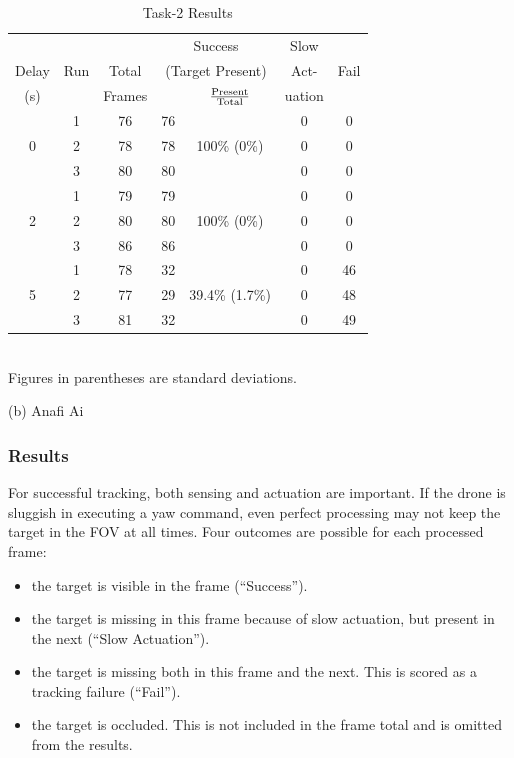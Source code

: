 \begin{table}
\begin{tabular}{|c|c|c|c|c|c|c|}
\hline
		 &  &  & \multicolumn{2}{c|}{Success} & Slow & \\
Delay & Run & Total  & \multicolumn{2}{c|}{\footnotesize (Target Present)} & Act- &  Fail\\
\cline{5-5} 
(s)&  &       Frames  &         & $\rm \frac{Present}{Total}$ & uation  & \\ 
\hline
    & 1 & 76 & 76 &    & 0 & 0 \\
0 & 2 & 78 & 78 & 100\% \scriptsize{(0\%)} & 0 & 0 \\
    & 3 & 80 & 80 &    & 0 & 0 \\
\hline
    & 1 & 79 & 79 &        & 0 & 0 \\
2 & 2 & 80 & 80 & 100\% \scriptsize{(0\%)} & 0 &  0 \\
    & 3 & 86 & 86 &        & 0 &  0 \\
\hline
    & 1 & 78 & 32 &        & 0 &  46 \\
5 & 2 & 77 & 29 & 39.4\% \scriptsize{(1.7\%)} & 0 & 48 \\
    & 3 & 81 & 32 &        & 0 &  49 \\
\hline
\end{tabular}
\begin{captext}
\centering \\[0.1cm] \small Figures in parentheses are standard deviations. \\
\end{captext}
{(b) Anafi Ai}

\caption{Task-2 Results}
\label{tab:task2-results}
\end{table}


\subsubsection{Results}
\label{sec:task2-results}
For successful tracking, both sensing and actuation are important.  If
the drone is sluggish in executing a yaw command, even perfect
processing may not keep the target in the FOV at all times.
Four outcomes are possible for each processed frame:
\begin{itemize}
	\item{the target is visible in the frame ({\small ``Success''}).}
	
	\item{the target is missing in this frame because of slow actuation, but present in the next ({\small ``Slow Actuation''}).}
	
	\item{the target is missing both in this frame and the next.
		This is scored as a tracking failure ({\small ``Fail''}).}
	
	\item{the target is occluded.
		This is not included in the frame total and is omitted from the results.}
\end{itemize}



